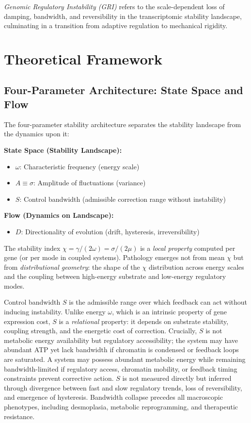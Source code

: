 \documentclass[11pt,letterpaper]{article}
\begin{document}
\textit{Genomic Regulatory Instability (GRI)} refers to the scale-dependent loss of damping, bandwidth, and reversibility in the transcriptomic stability landscape, culminating in a transition from adaptive regulation to mechanical rigidity.

\section{Theoretical Framework}

\subsection{Four-Parameter Architecture: State Space and Flow}

The four-parameter stability architecture separates the stability landscape from the dynamics upon it:

\textbf{State Space (Stability Landscape):}
\begin{itemize}
\item $\omega$: Characteristic frequency (energy scale)
\item $A \equiv \sigma$: Amplitude of fluctuations (variance)
\item $S$: Control bandwidth (admissible correction range without instability)
\end{itemize}

\textbf{Flow (Dynamics on Landscape):}
\begin{itemize}
\item $D$: Directionality of evolution (drift, hysteresis, irreversibility)
\end{itemize}

The stability index $\chi = \gamma/(2\omega) = \sigma/(2\mu)$ is a \textit{local property} computed per gene (or per mode in coupled systems). Pathology emerges not from mean $\chi$ but from \textit{distributional geometry}: the shape of the $\chi$ distribution across energy scales and the coupling between high-energy substrate and low-energy regulatory modes.

Control bandwidth $S$ is the admissible range over which feedback can act without inducing instability. Unlike energy $\omega$, which is an intrinsic property of gene expression cost, $S$ is a \textit{relational} property: it depends on substrate stability, coupling strength, and the energetic cost of correction. Crucially, $S$ is not metabolic energy availability but regulatory accessibility; the system may have abundant ATP yet lack bandwidth if chromatin is condensed or feedback loops are saturated. A system may possess abundant metabolic energy while remaining bandwidth-limited if regulatory access, chromatin mobility, or feedback timing constraints prevent corrective action. $S$ is not measured directly but inferred through divergence between fast and slow regulatory trends, loss of reversibility, and emergence of hysteresis. Bandwidth collapse precedes all macroscopic phenotypes, including desmoplasia, metabolic reprogramming, and therapeutic resistance.
\end{document}
